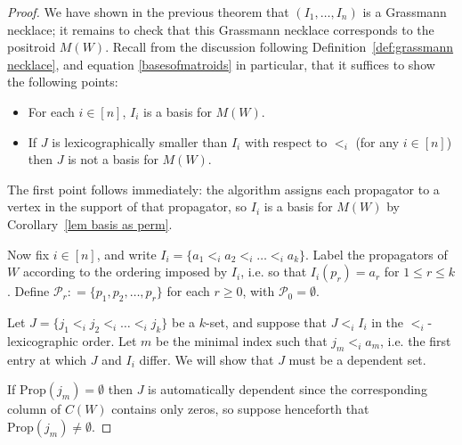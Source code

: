 \documentclass[11pt]{article}
\newcommand{\cP}{\mathcal{P}}
\newcommand{\Prop}{\textrm{Prop}}
\theoremstyle{remark}
\theoremstyle{definition}
\begin{document}
\begin{proof}
We have shown in the previous theorem that $(I_1,\dots,I_n)$ is a Grassmann necklace; it remains to check that this Grassmann necklace corresponds to the positroid $M(W)$. Recall from the discussion following Definition~\ref{def:grassmann necklace}, and equation \eqref{basesofmatroids} in particular, that it suffices to show the following points:
\begin{itemize}
\item For each $i \in [n]$, $I_i$ is a basis for $M(W)$.
\item If $J$ is lexicographically smaller than $I_i$ with respect to $<_i$ (for any $i \in [n]$) then $J$ is not a basis for $M(W)$. 
\end{itemize}
The first point follows immediately: the algorithm assigns each propagator to a vertex in the support of that propagator, so $I_i$ is a basis for $M(W)$ by Corollary~\ref{lem basis as perm}.

Now fix $i \in [n]$, and write $I_i = \{a_1 <_i a_2 <_i \dots <_i a_k\}$. Label the propagators of $W$ according to the ordering imposed by $I_i$, i.e. so that $I_i(p_{r}) = a_{r}$ for $1 \leq r \leq k$. Define $\cP_r: = \{p_1,p_2,\dots,p_r\}$ for each $r\geq 0$, with $\cP_0 = \emptyset$.


Let $J = \{j_1 <_i j_2<_i \dots <_i j_k\}$ be a $k$-set, and suppose that $J<_i I_i$ in the $<_i$-lexicographic order. Let $m$ be the minimal index such that $j_m <_i a_m$, i.e. the first entry at which $J$ and $I_i$ differ. We will show that $J$ must be a dependent set.

If $\Prop(j_m) = \emptyset$ then $J$ is automatically dependent since the corresponding column of $C(W)$ contains only zeros, so suppose henceforth that $\Prop(j_m) \neq \emptyset$. %


\end{proof}
\end{document}
